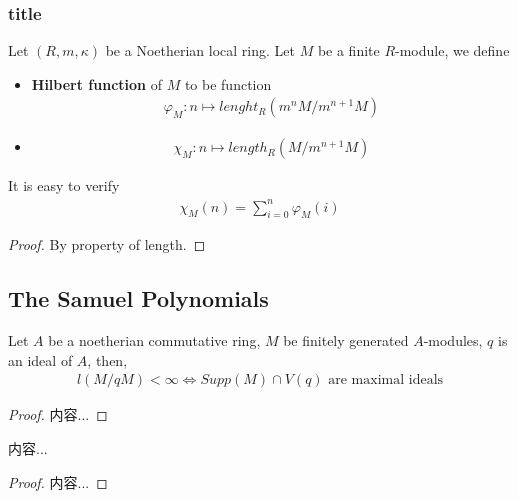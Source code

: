 \documentclass[Total.tex]{subfiles}
\begin{document}
				\subsubsection{title}
				
				\begin{Def}
					Let $(R,m,\kappa)$ be a Noetherian local ring. Let $M$ be a finite $R$-module, we define
					\begin{itemize}
						\item \textbf{Hilbert function} of $M$ to be function
						\begin{gather*}
							\varphi_M:n\mapsto lenght_R(m^n M/m^{n+1} M)
						\end{gather*}
						\item
						\begin{gather*}
							\chi_M:n\mapsto length_R(M/m^{n+1} M)
						\end{gather*}
					\end{itemize}
				\end{Def}
				
				\begin{lemma}
					It is easy to verify
					\begin{gather*}
						\chi_M(n)=\sum_{i=0}^n \varphi_M(i)
					\end{gather*}
				\end{lemma}
				\begin{proof}
					By property of length.
				\end{proof}
				
			\subsection{The Samuel Polynomials}
				
				\begin{lemma}
					Let $A$ be a noetherian commutative ring, $M$ be finitely generated $A$-modules, $q$ is an ideal of $A$, then,
					\begin{gather*}
						l(M/qM)<\infty\Leftrightarrow Supp(M)\cap V(q)\mbox{ are maximal ideals}
					\end{gather*}
				\end{lemma}
				\begin{proof}
					内容...
				\end{proof}
				
				\begin{corollary}
					内容...
				\end{corollary}
				\begin{proof}
					内容...
				\end{proof}
				
\end{document}
